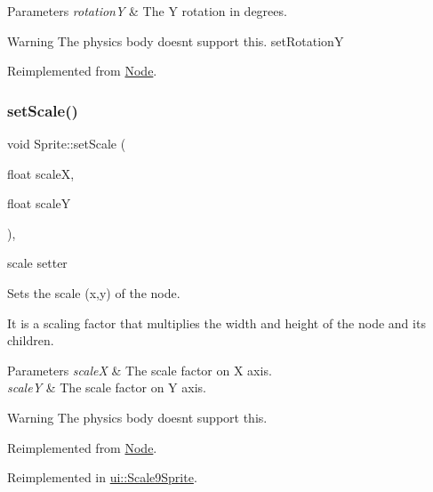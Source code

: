 \begin{DoxyParams}{Parameters}
{\em rotationY} & The Y rotation in degrees.\\
\hline
\end{DoxyParams}
\begin{DoxyWarning}{Warning}
The physics body doesn\textquotesingle{}t support this.  set\+RotationY 
\end{DoxyWarning}


Reimplemented from \hyperlink{classNode_a901c5fbd2327fbd6fd14771fd45d71af}{Node}.

\mbox{\label{classSprite_aa91d58969ba99f1bfd3ade56bda6fc5c}} 
\subsubsection{\texorpdfstring{set\+Scale()}{setScale()}\hspace{0.1cm}{\footnotesize\ttfamily [1/4]}}
{\footnotesize\ttfamily void Sprite\+::set\+Scale (\begin{DoxyParamCaption}\item[{float}]{scaleX,  }\item[{float}]{scaleY }\end{DoxyParamCaption})\hspace{0.3cm}{\ttfamily [override]}, {\ttfamily [virtual]}}



scale setter 

Sets the scale (x,y) of the node.

It is a scaling factor that multiplies the width and height of the node and its children.


\begin{DoxyParams}{Parameters}
{\em scaleX} & The scale factor on X axis. \\
\hline
{\em scaleY} & The scale factor on Y axis.\\
\hline
\end{DoxyParams}
\begin{DoxyWarning}{Warning}
The physics body doesn\textquotesingle{}t support this. 
\end{DoxyWarning}


Reimplemented from \hyperlink{classNode_a31f8130cfd505a5c327c4cc66fe4fa69}{Node}.



Reimplemented in \hyperlink{classui_1_1Scale9Sprite_a5c98e355992ab8f4e4cfc2f4eac8e104}{ui\+::\+Scale9\+Sprite}.

